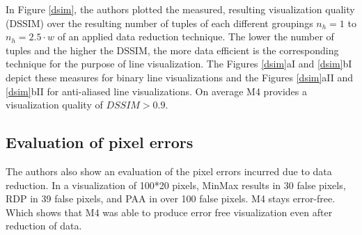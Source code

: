 In Figure \ref{dsim}, the authors plotted the measured, resulting visualization
quality (DSSIM) over the resulting number of tuples of each
different groupings $n_h = 1$ to $n_h = 2.5·w$ of an applied data
reduction technique. The lower the number of
tuples and the higher the DSSIM, the more data efficient is
the corresponding technique for the purpose of line visualization.
The Figures \ref{dsim}aI and \ref{dsim}bI depict these measures for
binary line visualizations and the Figures \ref{dsim}aII and \ref{dsim}bII
for anti-aliased line visualizations. On average
M4 provides a visualization quality of $DSSIM > 0.9$.

\subsection{Evaluation of pixel errors}
The authors also show an evaluation of the pixel errors incurred due to data reduction.
In a visualization of 100*20 pixels, MinMax results in 30 false pixels, RDP
in 39 false pixels, and PAA in over 100 false pixels. M4 stays
error-free. Which shows that M4 was able to produce error free visualization even after reduction of data.

